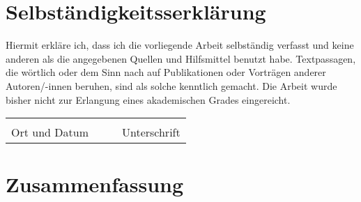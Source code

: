 \documentclass[
  pdftex,            %
  12pt,              %
  a4paper,           %
  parskip=relative,  %
  twoside,           %
  footinclude=false, %
  footheight=0mm,    %
  toc=bibliography,  %
  toc=listof         %
]{scrbook}           %
\theoremstyle{definitiontight}
\begin{document}

\listoffigures

\listoftables










\begin{appendices}

\chapter{Selbständigkeitsserklärung}
	
\vspace{1cm}
\noindent	
Hiermit erkläre ich, dass ich die vorliegende Arbeit selbständig verfasst und keine anderen als die angegebenen Quellen und Hilfsmittel benutzt habe.
Textpassagen, die wörtlich oder dem Sinn nach auf Publikationen oder Vorträgen anderer Autoren/-innen beruhen, sind als solche kenntlich gemacht.
Die Arbeit wurde bisher nicht zur Erlangung eines akademischen Grades eingereicht. 
	
\vspace{1.5cm}
	
\noindent\begin{tabularx}{\textwidth}{XXXX}
	&&& \\
	\cline{1-1}\cline{4-4}\footnotesize\centering Ort und Datum		&&& \footnotesize\centering Unterschrift
\end{tabularx}
	
\newpage

\chapter{Zusammenfassung}


\lipsum[1-4]

\end{appendices}
 
\backmatter
\end{document}
